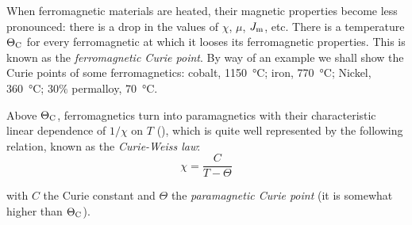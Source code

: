When ferromagnetic materials are heated, their magnetic properties become less pronounced: there is a drop in the values of $\chi$, $\mu$, $J_{\text{m}}$, etc. There is a temperature $\Theta_{\text{C}}$ for every ferromagnetic at which it looses its ferromagnetic properties. This is known as the \textit{ferromagnetic Curie point}. By way of an example we shall show the Curie points of some ferromagnetics: cobalt, \SI{1150}{\degreeCelsius}; iron, \SI{770}{\degreeCelsius}; Nickel, \SI{360}{\degreeCelsius}; $30\%$ permalloy, \SI{70}{\degreeCelsius}.

Above $\Theta_{\text{C}}$, ferromagnetics turn into paramagnetics with their characteristic linear dependence of $1/\chi$ on $T$ (), which is quite well represented by the following relation, known as the \textit{Curie-Weiss law}:
\begin{equation}\label{eq:7_12}
    \chi = \frac{C}{T - \Theta}
\end{equation}

\noindent
with $C$ the Curie constant and $\Theta$ the \textit{paramagnetic Curie point} (it is somewhat higher than $\Theta_{\text{C}}$).

